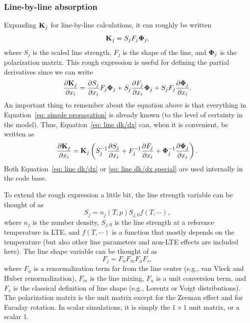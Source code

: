 \subsubsection{Line-by-line absorption}

Expanding $\mathbf{K}_j$ for line-by-line calculations,
it can roughly be written
\begin{equation}
  \mathbf{K}_j = S_jF_j\mathbf{\Phi}_j, \label{eq: simple propagation}
\end{equation}
where $S_j$ is the scaled line strength, $F_j$ is the shape of the line, 
and $\mathbf{\Phi}_j$ is the polarization matrix.
This rough expression is useful for defining the partial derivatives since
we can write
\begin{equation}
  \frac{\partial \mathbf{K}_j}{\partial x_i} = 
  \frac{\partial S_j}{\partial x_i}F_j\mathbf{\Phi}_j+
  S_j\frac{\partial F_j}{\partial x_i}\mathbf{\Phi}_j+
  S_jF_j\frac{\partial \mathbf{\Phi}_j}{\partial x_i}.
  \label{eq: line dk/dx}
\end{equation}
An important thing to remember about the equation above is that
everything in Equation~\ref{eq: simple propagation} is  already 
known (to the level of certainty in the model).  Thus, 
Equation~\ref{eq: line dk/dx} can, when it is convenient, be written as
\begin{equation}
  \frac{\partial \mathbf{K}_j}{\partial x_i} = \mathbf{K}_j
  \left(
  S_j^{-1}\frac{\partial S_j}{\partial x_i}+
  F_j^{-1}\frac{\partial F_j}{\partial x_i}+
  \mathbf{\Phi}_j^{-1}\frac{\partial \mathbf{\Phi}_j}{\partial x_i}
  \right). \label{eq: line dk/dx special}
\end{equation}
Both Equation~\ref{eq: line dk/dx} or \ref{eq: line dk/dx special} are
used internally in the code base.

To extend the rough expression a little bit, the line strength 
variable can be thought of as
\begin{equation}
  S_j = n_j(T,p) S_{j,0} f(T,\cdots),\label{eq: rough line strength}
\end{equation}
where $n_j$ is the number density, $S_{j,0}$ is the line strength 
at a reference temperature in LTE, and
$f(T,\cdots)$ is a function that mostly depends on the temperature
(but also other line parameters and non-LTE effects are included here).
The line shape variable can be thought of as
\begin{equation}
  F_j = F_n F_m F_u F_s,\label{eq: rough line shape}
\end{equation}
where $F_n$ is a renormalization term far from the line center (e.g., van Vleck and Huber renormalization),
$F_m$ is the line mixing,
$F_u$ is a unit conversion term, and
$F_s$ is the classical definition of line shape (e.g., Lorentz or Voigt distributions).
The polarization matrix is the unit matrix except for the Zeeman effect and for Faraday rotation.
In scalar simulations, it is simply the $1\times1$ unit matrix, or a scalar 1.

